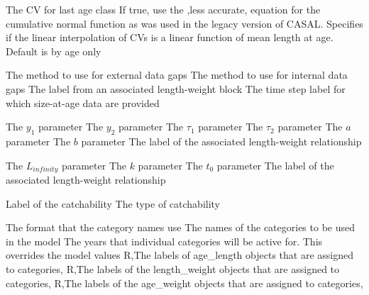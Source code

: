  {The CV for last age class}
 {If true, use the ,less accurate, equation for the cumulative normal function as was used in the legacy version of CASAL.}
 {Specifies if the linear interpolation of CVs is a linear function of mean length at age. Default is by age only}
\par\textbf{}\par
{} {The method to use for external data gaps}
 {The method to use for internal data gaps}
 {The label from an associated length-weight block}
 {The time step label for which size-at-age data are provided}
\par\textbf{}\par
\par\textbf{}\par
{} {The $y_1$ parameter}
 {The $y_2$ parameter}
 {The $\tau_1$ parameter}
 {The $\tau_2$ parameter}
 {The $a$ parameter}
 {The $b$ parameter}
 {The label of the associated length-weight relationship}
\par\textbf{}\par
{} {The $L_{infinity}$ parameter}
 {The $k$ parameter}
 {The $t_0$ parameter}
 {The label of the associated length-weight relationship}
\par\par
{} {Label of the catchability}
 {The type of catchability}
\par\par
{} {The format that the category names use}
 {The names of the categories to be used in the model}
 {The years that individual categories will be active for. This overrides the model values}
 {R,The labels of age\_length objects that are assigned to categories,}
 {R,The labels of the length\_weight objects that are assigned to categories,}
 {R,The labels of the age\_weight objects that are assigned to categories,}

